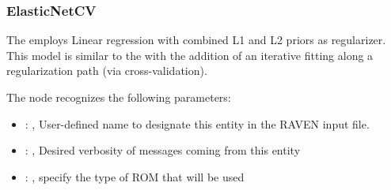 \subsubsection{ElasticNetCV}
  The  employs                         Linear regression with combined L1 and
  L2 priors as regularizer.                         This model is similar to the
                           with the addition of an iterative fitting along a
  regularization path (via cross-validation).

  The  node recognizes the following parameters:
    \begin{itemize}
      \item {}: ,
        User-defined name to designate this entity in the RAVEN input file.
      \item {}: ,
        Desired verbosity of messages coming from this entity
      \item {}: ,
        specify the type of ROM that will be used
  \end{itemize}

